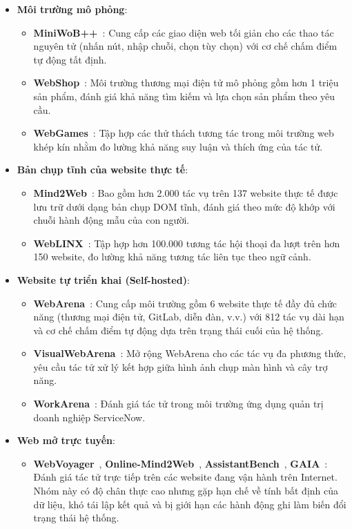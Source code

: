 \begin{itemize}
  \item \textbf{Môi trường mô phỏng}:
    \begin{itemize}
      \item \textbf{MiniWoB++}~\cite{liu2018miniwob}: Cung cấp các giao diện web tối giản cho các thao tác nguyên tử (nhấn nút, nhập chuỗi, chọn tùy chọn) với cơ chế chấm điểm tự động tất định.
      \item \textbf{WebShop}~\cite{yao2022webshop}: Môi trường thương mại điện tử mô phỏng gồm hơn 1 triệu sản phẩm, đánh giá khả năng tìm kiếm và lựa chọn sản phẩm theo yêu cầu.
      \item \textbf{WebGames}~\cite{thomas2025webgames}: Tập hợp các thử thách tương tác trong môi trường web khép kín nhằm đo lường khả năng suy luận và thích ứng của tác tử.
    \end{itemize}
  \item \textbf{Bản chụp tĩnh của website thực tế}:
    \begin{itemize}
      \item \textbf{Mind2Web}~\cite{deng2023mind2web}: Bao gồm hơn 2.000 tác vụ trên 137 website thực tế được lưu trữ dưới dạng bản chụp DOM tĩnh, đánh giá theo mức độ khớp với chuỗi hành động mẫu của con người.
      \item \textbf{WebLINX}~\cite{lu2024weblinx}: Tập hợp hơn 100.000 tương tác hội thoại đa lượt trên hơn 150 website, đo lường khả năng tương tác liên tục theo ngữ cảnh.
    \end{itemize}
  \item \textbf{Website tự triển khai (Self-hosted)}:
    \begin{itemize}
      \item \textbf{WebArena}~\cite{zhou2024webarena}: Cung cấp môi trường gồm 6 website thực tế đầy đủ chức năng (thương mại điện tử, GitLab, diễn đàn, v.v.) với 812 tác vụ dài hạn và cơ chế chấm điểm tự động dựa trên trạng thái cuối của hệ thống.
      \item \textbf{VisualWebArena}~\cite{koh2024visualwebarena}: Mở rộng WebArena cho các tác vụ đa phương thức, yêu cầu tác tử xử lý kết hợp giữa hình ảnh chụp màn hình và cây trợ năng.
      \item \textbf{WorkArena}~\cite{drouin2024workarena}: Đánh giá tác tử trong môi trường ứng dụng quản trị doanh nghiệp ServiceNow.
    \end{itemize}
  \item \textbf{Web mở trực tuyến}:
    \begin{itemize}
      \item \textbf{WebVoyager}~\cite{he2024webvoyager}, \textbf{Online-Mind2Web}~\cite{xue2025illusion}, \textbf{AssistantBench}~\cite{yoran2024assistantbench}, \textbf{GAIA}~\cite{mialon2024gaia}: Đánh giá tác tử trực tiếp trên các website đang vận hành trên Internet. Nhóm này có độ chân thực cao nhưng gặp hạn chế về tính bất định của dữ liệu, khó tái lập kết quả và bị giới hạn các hành động ghi làm biến đổi trạng thái hệ thống.
    \end{itemize}
\end{itemize}

